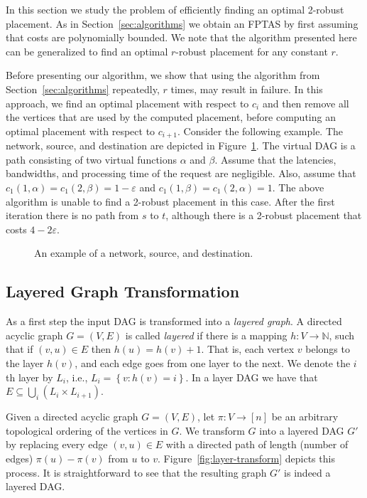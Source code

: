 \documentclass[11pt]{article}
\newcommand{\set}[1]{\left\{ #1 \right\}}
\newcommand{\naturals}{\mathbb{N}}
\newcommand{\eps}{\varepsilon}
\begin{document}
In this section we study the problem of efficiently finding an optimal
2-robust placement.  As in Section~\ref{sec:algorithms} we obtain an
FPTAS by first assuming that costs are polynomially bounded.  We note
that the algorithm presented here can be generalized to find an
optimal $r$-robust placement for any constant $r$.

Before presenting our algorithm, we show that using the algorithm from
Section~\ref{sec:algorithms} repeatedly, $r$ times, may result in
failure.  In this approach, we find an optimal placement with respect
to $c_i$ and then remove all the vertices that are used by the
computed placement, before computing an optimal placement with respect
to $c_{i+1}$.
%
Consider the following example.  The network, source, and destination
are depicted in Figure~\ref{fig:greedy-bad}.  The virtual DAG is a
path consisting of two virtual functions $\alpha$ and $\beta$.  Assume
that the latencies, bandwidths, and processing time of the request are
negligible.  Also, assume that $c_1(1, \alpha) = c_1(2,\beta) =
1-\eps$ and $c_1(1, \beta) = c_1(2, \alpha) = 1$.
%
The above algorithm is unable to find a 2-robust placement in this
case.  After the first iteration there is no path from $s$ to $t$,
although there is a 2-robust placement that costs $4 - 2 \eps$.

\begin{figure}[t]
\begin{center}

\end{center}
\caption{An example of a network, source, and destination.}
\label{fig:greedy-bad}
\end{figure}


\subsection{Layered Graph Transformation}

As a first step the input DAG is transformed into a \emph{layered
  graph}.
%
A directed acyclic graph $G = (V,E)$ is called \emph{layered} if there
is a mapping $h:V \to \naturals$, such that if $(v,u) \in E$ then
$h(u) = h(v) + 1$.  That is, each vertex $v$ belongs to the layer
$h(v)$, and each edge goes from one layer to the next.
%
We denote the $i$th layer by $L_i$, i.e., $L_i = \set{v : h(v) = i}$.
In a layer DAG we have that $E \subseteq \bigcup_i (L_i \times
L_{i+1})$.

Given a directed acyclic graph $G = (V,E)$, let $\pi:V \to [n]$ be an
arbitrary topological ordering of the vertices in $G$.  We transform
$G$ into a layered DAG $G'$ by replacing every edge $(v,u) \in E$ with
a directed path of length (number of edges) $\pi(u) - \pi(v)$ from $u$
to $v$.
%
Figure~\ref{fig:layer-transform} depicts this process.  It is
straightforward to see that the resulting graph $G'$ is indeed a
layered DAG.
\end{document}
